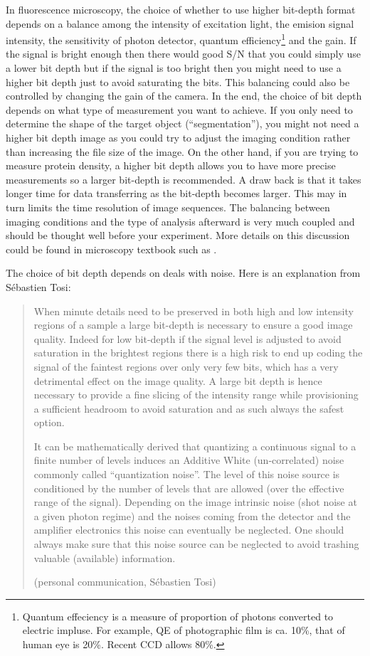 In fluorescence microscopy, the choice of whether to use higher bit-depth format depends on a balance among the intensity of excitation light,  the emision signal intensity, the sensitivity of photon detector, quantum efficiency\footnote{Quantum effeciency is a measure of proportion of photons converted to electric impluse. For example, QE of photographic film is ca. 10\%, that of human eye is 20\%. Recent CCD allows 80\%. } and the gain. If the signal is bright enough then there would good S/N that you could simply use a lower bit depth but if the signal is too bright then you might need to use a higher bit depth just to avoid saturating the bits. This balancing could also be controlled by changing the gain of the camera. In the end, the choice of bit depth depends on what type of measurement you want to achieve. 
If you only need to determine the shape of the target object (``segmentation''), you might not need a higher bit depth image as you could try to adjust the imaging condition rather than increasing the file size of the image. 
On the other hand, if you are trying to measure protein density, a higher bit depth allows you to have more precise measurements so a larger bit-depth is recommended. A draw back is that it takes longer time for data transferring as the bit-depth becomes larger. This may in turn limits the time resolution of image sequences.
The balancing between imaging conditions and the type of  analysis afterward is very much coupled and should be thought well before your experiment. More details on this discussion could be found in microscopy textbook such as \cite{Pawley2006}. 

The choice of bit depth depends on deals with noise. Here is an explanation from S\'{e}bastien Tosi:
\begin{quote}
When minute details need to be preserved in both high and low intensity regions of a sample a large bit-depth is necessary to ensure a good image quality. Indeed for low bit-depth if the signal level is adjusted to avoid saturation in the brightest regions there is a high risk to end up coding the signal of the faintest regions over only very few bits, which has a very detrimental effect on the image quality. A large bit depth is hence necessary to provide a fine slicing of the intensity range while provisioning a sufficient headroom to avoid saturation and as such always the safest option. 

It can be mathematically derived that quantizing a continuous signal to a finite number of levels induces an Additive White (un-correlated) noise commonly called ``quantization noise''. The level of this noise source is conditioned by the number of levels that are allowed (over the effective range of the signal). Depending on the image intrinsic noise (shot noise at a given photon regime) and the noises coming from the detector and the amplifier electronics this noise can eventually be neglected. One should always make sure that this noise source can be neglected to avoid trashing valuable (available) information.

(personal communication, S\'{e}bastien Tosi)
\end{quote}



